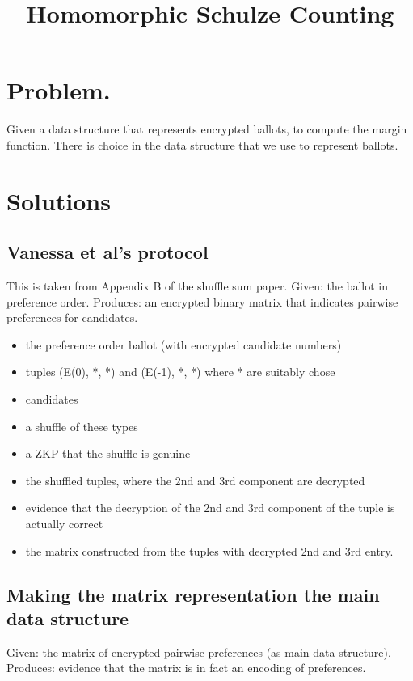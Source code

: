 \documentclass{llncs}
\title{Homomorphic Schulze Counting}
\begin{document}
\maketitle

\section{Problem.}

Given a data structure that represents encrypted ballots, to compute
the margin function. There is choice in the data structure that we
use to represent ballots.

\section{Solutions}
\subsection{Vanessa et al's protocol}

This is taken from Appendix B of the shuffle sum paper. Given: the
ballot in preference order. Produces: an encrypted binary matrix
that indicates pairwise preferences for candidates.

\begin{itemize}
\item the preference order ballot (with encrypted candidate numbers)
\item tuples (E(0), *, *) and (E(-1), *, *) where * are suitably chose
\item candidates
\item a shuffle of these types
\item a ZKP that the shuffle is genuine
\item the shuffled tuples, where the 2nd and 3rd component are decrypted
\item evidence that the decryption of the 2nd and 3rd component of the
      tuple is actually correct
\item the matrix constructed from the tuples with decrypted 2nd and 3rd
      entry.
\end{itemize}

\subsection{Making the matrix representation the main data
structure}

Given: the matrix of encrypted pairwise preferences (as main data
structure). Produces: evidence that the matrix is in fact an
encoding of preferences.
\end{document}
